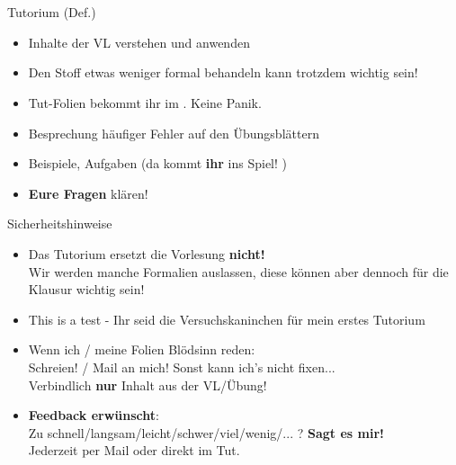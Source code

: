 






\section{}

\aboutMeFrame

\begin{frame}[t]{Tutorium (Def.)}
	\begin{itemize}[<+->]
		\item Inhalte der VL verstehen und anwenden
	    \item Den Stoff etwas weniger formal behandeln \impl {} kann trotzdem wichtig sein! 
		\item Tut-Folien bekommt ihr im \ILIAS. Keine Panik.
		\item Besprechung häufiger Fehler auf den Übungsblättern
		\item Beispiele, Aufgaben (da kommt \textbf{ihr} ins Spiel! \smiley)
		\item \textbf{Eure Fragen} klären!
	\end{itemize}
\end{frame}

\begin{frame}[t]{Sicherheitshinweise}
	\begin{itemize}[<+->]
		\item Das Tutorium ersetzt die Vorlesung \textbf{nicht!} \\
			  Wir werden manche Formalien auslassen, diese können aber dennoch für die Klausur wichtig sein!
	    \item This is a test - Ihr seid die Versuchskaninchen für mein erstes Tutorium 
	    \item Wenn ich / meine Folien Blödsinn reden: \\
		      Schreien! / Mail an mich! \impl Sonst kann ich's nicht fixen... \frownie \\
		      Verbindlich \textbf{nur} Inhalt aus der VL/Übung! 
		\item \textbf{Feedback erwünscht}: \\
			  Zu schnell/langsam/leicht/schwer/viel/wenig/... ? \impl \textbf{Sagt es mir!}\\
			  Jederzeit per Mail oder direkt im Tut.
	\end{itemize}
\end{frame}


